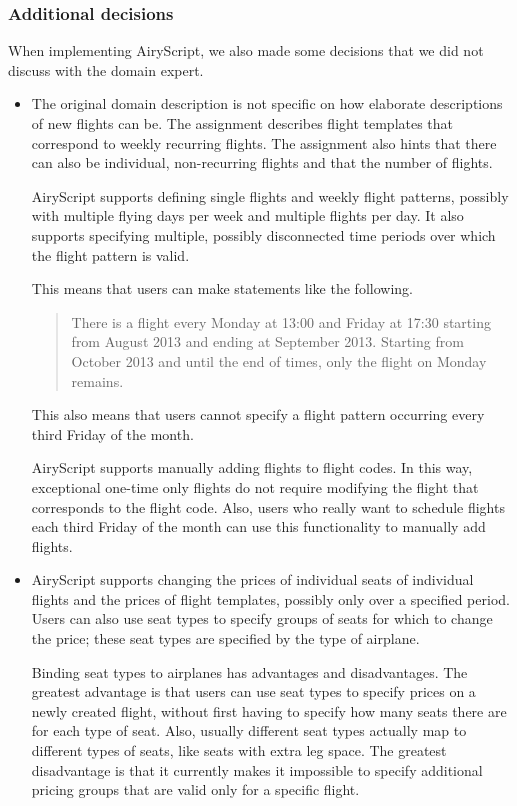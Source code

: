 \subsubsection{Additional decisions}
\label{sec:additional_decisions}
When implementing AiryScript, we also made some decisions that we did not
discuss with the domain expert.
\begin{itemize}

  \item The original domain description is not specific on how elaborate
    descriptions of new flights can be. The assignment describes flight
    templates that correspond to weekly recurring flights. The assignment also
    hints that there can also be individual, non-recurring flights and that the
    number of flights.
    
    AiryScript supports defining single flights and weekly flight patterns,
    possibly with multiple flying days per week and multiple flights per day. It
    also supports specifying multiple, possibly disconnected time periods over
    which the flight pattern is valid.
    
    This means that users can make statements like the following.
    \begin{quote}
      There is a flight every Monday at 13:00 and Friday at 17:30 starting from
      August 2013 and ending at September 2013. Starting from October 2013 and
      until the end of times, only the flight on Monday remains.
    \end{quote}
    This also means that users cannot specify a flight pattern occurring every
    third Friday of the month.
    
    AiryScript supports manually adding flights to flight codes. In this
    way, exceptional one-time only flights do not require modifying the flight
    that corresponds to the flight code. Also, users who really want to
    schedule flights each third Friday of the month can use this functionality
    to manually add flights.

  \item AiryScript supports changing the prices of individual seats of
    individual flights and the prices of flight templates, possibly only over a
    specified period. Users can also use seat types to specify groups of seats
    for which to change the price; these seat types are specified by the type of
    airplane.

    Binding seat types to airplanes has advantages and disadvantages. The
    greatest advantage is that users can use seat types to specify prices on a
    newly created flight, without first having to specify how many seats
    there are for each type of seat. Also, usually different seat types actually
    map to different types of seats, like seats with extra leg space. The
    greatest disadvantage is that it currently makes it impossible to specify
    additional pricing groups that are valid only for a specific flight.


\end{itemize}
